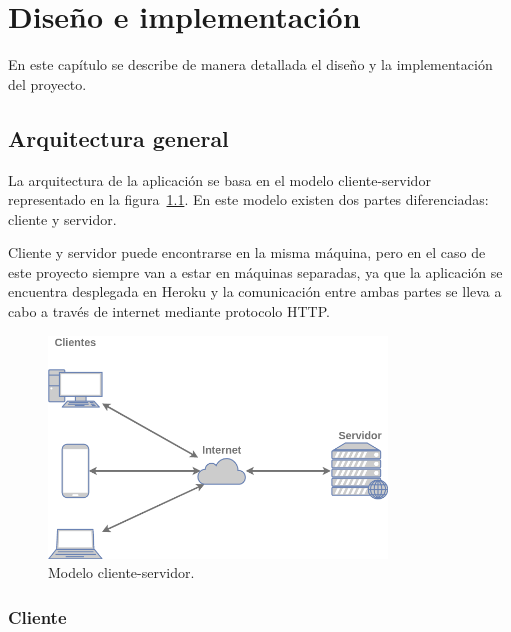 \documentclass[a4paper, 12pt]{book}
\begin{document}

\cleardoublepage
\chapter{Diseño e implementación}

En este capítulo se describe de manera detallada el diseño y la implementación del proyecto.

\section{Arquitectura general} 
\label{sec:arquitectura}

La arquitectura de la aplicación se basa en el modelo cliente-servidor representado en la figura~\ref{fig:cliente-servidor}.
En este modelo existen dos partes diferenciadas: cliente y servidor.

Cliente y servidor puede encontrarse en la misma máquina, pero en el caso de este proyecto siempre van a estar en máquinas separadas, ya que la aplicación se encuentra desplegada en Heroku y la comunicación entre ambas partes se lleva a cabo a través de internet mediante protocolo HTTP.

\begin{figure}
  \centering
  \includegraphics[width=9cm, keepaspectratio]{img/cliente-servidor.png}
  \caption{Modelo cliente-servidor.}\label{fig:cliente-servidor}
\end{figure}

\subsection{Cliente}
\label{subsec:arq_cliente}
\end{document}

